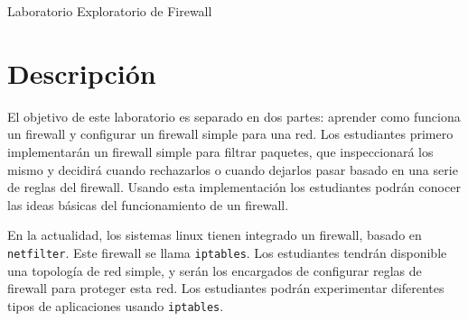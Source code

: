 
\newcommand{\commonfolder}{../../common-files}




\newcommand{\telnet} {\texttt{telnet}\xspace}
\newcommand{\iptables}{\texttt{iptables}\xspace}
\newcommand{\netfilter}{\texttt{netfilter}\xspace}
\newcommand{\Netfilter}{\texttt{Netfilter}\xspace}

\newcommand{\firewallFigs}{./Figs}

\newcommand{\pointleft}[1]{\reflectbox{\ding{217}} \textbf{\texttt{#1}}}





\begin{center}
{\LARGE Laboratorio Exploratorio de Firewall}
\end{center}




\section{Descripción}

El objetivo de este laboratorio es separado en dos partes: aprender como funciona un firewall y configurar un firewall simple para una red. Los estudiantes primero implementarán un firewall simple para filtrar paquetes, que inspeccionará los mismo y decidirá cuando rechazarlos o cuando dejarlos pasar basado en una serie de reglas del firewall.
Usando esta implementación los estudiantes podrán conocer las ideas básicas del funcionamiento de un firewall.

En la actualidad, los sistemas linux tienen integrado un firewall, basado en \texttt{netfilter}. Este firewall se llama \iptables. 
Los estudiantes tendrán disponible una topología de red simple, y serán los encargados de configurar reglas de firewall para proteger esta red.
Los estudiantes podrán experimentar diferentes tipos de aplicaciones usando \iptables. 


